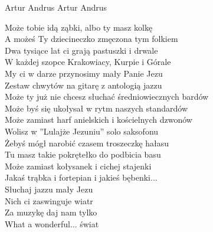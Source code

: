 {Artur Andrus}
{Artur Andrus}
\begin{text}
Może tobie idą ząbki, albo ty masz kolkę\\
A możeś Ty dziecineczko zmęczona tym folkiem\\

Dwa tysiące lat ci grają pastuszki i drwale\\
W każdej szopce Krakowiacy, Kurpie i Górale\\

My ci w darze przynosimy mały Panie Jezu\\
Zestaw chwytów na gitarę z antologią jazzu\\

Może ty już nie chcesz słuchać średniowiecznych bardów\\
Może byś się ukołysał w rytm naszych standardów\\

Może zamiast harf anielskich i kościelnych dzwonów\\
Wolisz w ”Lulajże Jezuniu” solo saksofonu\\

Żebyś mógł narobić czasem troszeczkę hałasu\\
Tu masz takie pokrętełko do podbicia basu\\

Może zamiast kołysanek i cichej stajenki\\
Jakaś trąbka i fortepian i jakieś bębenki...\\

Słuchaj jazzu mały Jezu\\
Nich ci zaswinguje wiatr\\
Za muzykę daj nam tylko \\
What a wonderful... świat\\
\end{text}
